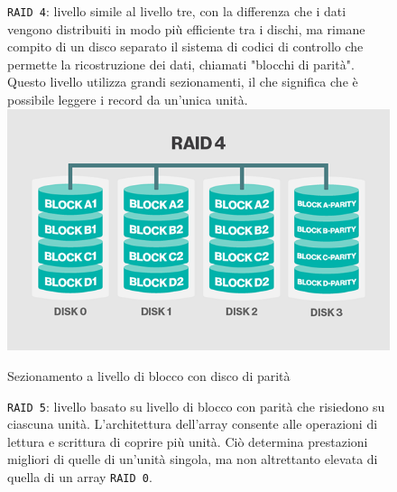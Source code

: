 \begin{itemize}
\begin{figure}[htbp]
\item
\verb"RAID 4": livello simile al livello tre, con la differenza che i dati vengono distribuiti in modo pi\`{u} efficiente tra i dischi, ma rimane compito di un disco separato il sistema di codici di controllo che permette la ricostruzione dei dati, chiamati "blocchi di parit\`{a}".\\
Questo livello utilizza grandi sezionamenti, il che significa che \`{e} possibile leggere i record da un'unica unit\`{a}.\cite{etichetta9}\\

\centering
\includegraphics[scale=0.40]{img/raid44.png}\\
\caption{Sezionamento a livello di blocco con disco di parit\`{a}\label{figura1.8} \cite{etichetta9}}
\end{figure}

\begin{figure}[htbp]
\item
\verb"RAID 5": livello basato su livello di blocco con parit\`{a} che risiedono su ciascuna unit\`{a}. L'architettura dell'array consente alle operazioni di lettura e scrittura di coprire pi\`{u} unit\`{a}. Ci\`{o} determina prestazioni migliori di quelle di un'unit\`{a} singola, ma non altrettanto elevata di quella di un array \verb"RAID 0".\cite{etichetta9}\\


\end{figure}
\end{itemize}
